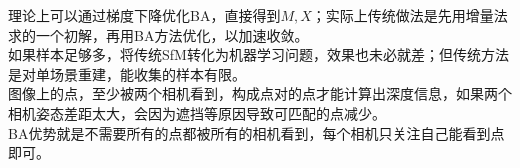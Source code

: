 	理论上可以通过梯度下降优化BA，直接得到$M,X$；实际上传统做法是先用增量法求的一个初解，再用BA方法优化，以加速收敛。\\

	如果样本足够多，将传统SfM转化为机器学习问题，效果也未必就差；但传统方法是对单场景重建，能收集的样本有限。\\

	图像上的点，至少被两个相机看到，构成点对的点才能计算出深度信息，如果两个相机姿态差距太大，会因为遮挡等原因导致可匹配的点减少。\\

	BA优势就是不需要所有的点都被所有的相机看到，每个相机只关注自己能看到点即可。